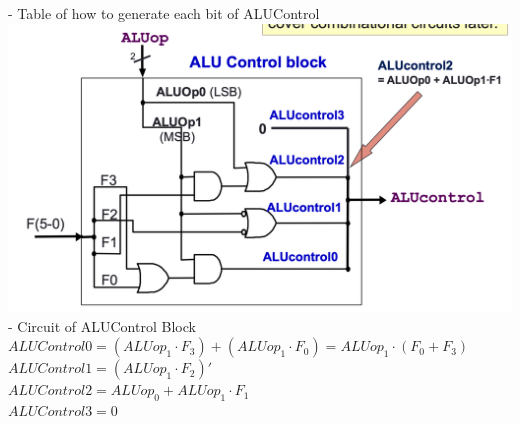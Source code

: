 \documentclass[10pt, a4paper]{article}
\begin{document}
\begin{multicols*}{3}
		- Table of how to generate each bit of ALUControl\\
		\includegraphics[scale=.25]{./assets/ALUControlBlockCircuit}\\
		- Circuit of ALUControl Block\\
		
		$ALUControl0 = (ALUop_1 \cdot F_3) + (ALUop_1 \cdot F_0) = ALUop_1 \cdot (F_0 + F_3)$\\
		$ALUControl1 = (ALUop_1 \cdot F_2)'$\\
		$ALUControl2 = ALUop_0 + ALUop_1 \cdot F_1$\\
		$ALUControl3 = 0$\\
		

\end{multicols*}
\end{document}
